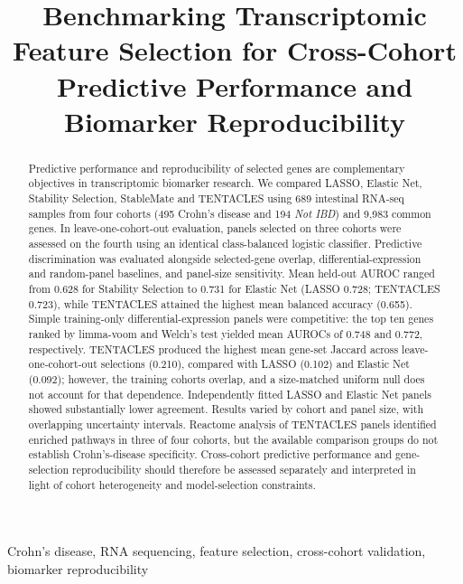 \documentclass[conference,a4paper]{IEEEtran}
\begin{document}
\title{Benchmarking Transcriptomic Feature Selection for Cross-Cohort Predictive Performance and Biomarker Reproducibility}
\author{
}
\maketitle
\begin{abstract}
Predictive performance and reproducibility of selected genes are complementary objectives in transcriptomic biomarker research. We compared LASSO, Elastic Net, Stability Selection, StableMate and TENTACLES using 689 intestinal RNA-seq samples from four cohorts (495 Crohn's disease and 194 \emph{Not IBD}) and 9,983 common genes. In leave-one-cohort-out evaluation, panels selected on three cohorts were assessed on the fourth using an identical class-balanced logistic classifier. Predictive discrimination was evaluated alongside selected-gene overlap, differential-expression and random-panel baselines, and panel-size sensitivity. Mean held-out AUROC ranged from 0.628 for Stability Selection to 0.731 for Elastic Net (LASSO 0.728; TENTACLES 0.723), while TENTACLES attained the highest mean balanced accuracy (0.655). Simple training-only differential-expression panels were competitive: the top ten genes ranked by limma-voom and Welch's test yielded mean AUROCs of 0.748 and 0.772, respectively. TENTACLES produced the highest mean gene-set Jaccard across leave-one-cohort-out selections (0.210), compared with LASSO (0.102) and Elastic Net (0.092); however, the training cohorts overlap, and a size-matched uniform null does not account for that dependence. Independently fitted LASSO and Elastic Net panels showed substantially lower agreement. Results varied by cohort and panel size, with overlapping uncertainty intervals. Reactome analysis of TENTACLES panels identified enriched pathways in three of four cohorts, but the available comparison groups do not establish Crohn's-disease specificity. Cross-cohort predictive performance and gene-selection reproducibility should therefore be assessed separately and interpreted in light of cohort heterogeneity and model-selection constraints.
\end{abstract}
\begin{IEEEkeywords}
Crohn's disease, RNA sequencing, feature selection, cross-cohort validation, biomarker reproducibility
\end{IEEEkeywords}







\end{document}
